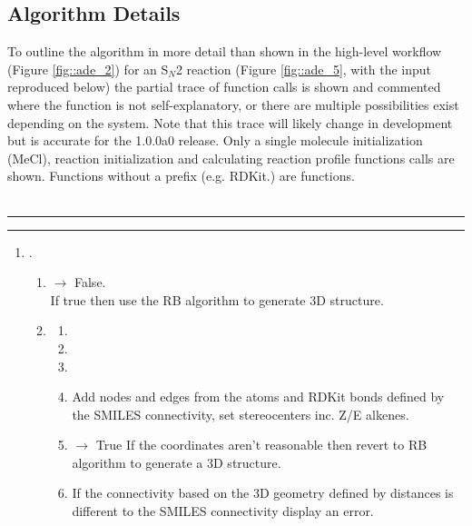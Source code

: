 \documentclass[../../main.tex]{subfiles}
\begin{document}
\subsection{Algorithm Details}
\label{section::ade_si_algorithm}

To outline the algorithm in more detail than shown in the high-level workflow (Figure \ref{fig::ade_2}) for an S$_N$2 reaction (Figure \ref{fig::ade_5}, with the input reproduced below) the partial trace of function calls is shown and commented where the function is not self-explanatory, or there are multiple possibilities exist depending on the system. Note that this trace will likely change in development but is accurate for the 1.0.0a0 release. Only a single molecule initialization (MeCl), reaction initialization and calculating reaction profile functions calls are shown. Functions without a prefix (e.g. RDKit.) are \ade functions.
\\\\
\hrule
{}
\hrule

\begin{enumerate}
	\item {}.
	
	\begin{enumerate}
		\item {} $\rightarrow$ False.\\
		If true then use the RB algorithm to generate 3D 
		structure.
		
		\item {}
		
		\begin{enumerate}
			\item {}
			
			\item {}
			
			\item {}
			
			\item  {}
			Add nodes and edges from the atoms and RDKit
			bonds defined by the SMILES connectivity, set 
			stereocenters inc. Z/E alkenes.
			
			\item {} $\rightarrow$ True
			If the coordinates aren’t reasonable then revert to
			RB algorithm to generate a 3D structure.
			
			\item  {}
			If the connectivity based on the 3D geometry 
			defined by distances is different to the SMILES         
			connectivity display an error.
		\end{enumerate}
	\end{enumerate}	
\end{enumerate}
\end{document}
